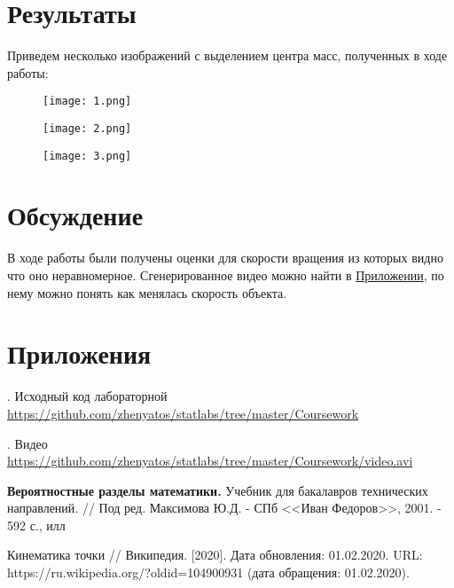 \documentclass[12pt,a4paper]{article}
\begin{document}
\section{Результаты}
Приведем несколько изображений с выделением центра масс, полученных в ходе работы:
\begin{figure}[h!]
	\centering
	\texttt{[image: 1.png]}
	\label{1}
\end{figure}

\begin{figure}[h!]
	\centering
	\texttt{[image: 2.png]}
	\label{2}
\end{figure}

\begin{figure}[h!]
	\centering
	\texttt{[image: 3.png]}
	\label{3}
\end{figure}
\pagebreak

\section{Обсуждение}
В ходе работы были получены оценки для скорости вращения из которых видно что оно неравномерное. Сгенерированное видео можно найти в \hyperref[appl]{Приложении}, по нему можно понять как менялась скорость объекта.
\pagebreak

\section{Приложения}\label{appl}
. Исходный код лабораторной {\url{https://github.com/zhenyatos/statlabs/tree/master/Coursework}}

. Видео
{\url{https://github.com/zhenyatos/statlabs/tree/master/Coursework/video.avi}}

\begin{thebibliography}{9} 
	
	 \textbf{Вероятностные разделы математики.} Учебник для бакалавров технических направлений. // Под ред. Максимова Ю.Д. - СПб <<Иван Федоров>>, 2001. - 592 с., илл
	
	 Кинематика точки // Википедия. [2020]. Дата обновления: 01.02.2020. URL: https://ru.wikipedia.org/?oldid=104900931 (дата обращения: 01.02.2020).
\end{thebibliography}
\end{document}
